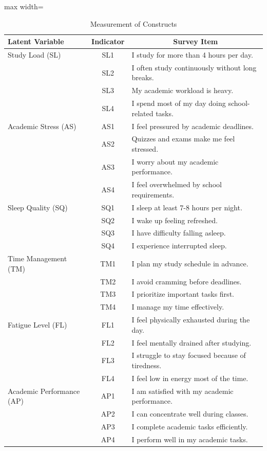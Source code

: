 \documentclass [12pt]{article}
\begin{document}
\begin{table}[H]
\captionsetup{
    labelfont=bf,
    labelsep=newline,
    justification=raggedright,
    singlelinecheck=false
}
\caption{Measurement of Constructs}

\begin{adjustbox}{max width=\textwidth} 
\centering
\begin{tabular}{l c p{9cm}}
\toprule
\textbf{Latent Variable} & \textbf{Indicator} & \multicolumn{1}{c}{\textbf{Survey Item}} \\
\midrule
Study Load (SL) & SL1 & I study for more than 4 hours per day. \\
 & SL2 & I often study continuously without long breaks. \\
 & SL3 & My academic workload is heavy. \\
 & SL4 & I spend most of my day doing school-related tasks. \\
\midrule
Academic Stress (AS) & AS1 & I feel pressured by academic deadlines. \\
 & AS2 & Quizzes and exams make me feel stressed. \\
 & AS3 & I worry about my academic performance. \\
 & AS4 & I feel overwhelmed by school requirements. \\
\midrule
Sleep Quality (SQ) & SQ1 & I sleep at least 7-8 hours per night. \\
 & SQ2 & I wake up feeling refreshed. \\
 & SQ3 & I have difficulty falling asleep. \\
 & SQ4 & I experience interrupted sleep. \\
\midrule
Time Management (TM) & TM1 & I plan my study schedule in advance. \\
 & TM2 & I avoid cramming before deadlines. \\
 & TM3 & I prioritize important tasks first. \\
 & TM4 & I manage my time effectively. \\
\midrule
Fatigue Level (FL) & FL1 & I feel physically exhausted during the day. \\
 & FL2 & I feel mentally drained after studying. \\
 & FL3 & I struggle to stay focused because of tiredness. \\
 & FL4 & I feel low in energy most of the time. \\
\midrule
Academic Performance (AP) & AP1 & I am satisfied with my academic performance. \\
 & AP2 & I can concentrate well during classes. \\
 & AP3 & I complete academic tasks efficiently. \\
 & AP4 & I perform well in my academic tasks. \\
\bottomrule
\end{tabular}
\end{adjustbox}
\end{table}
\end{document}
